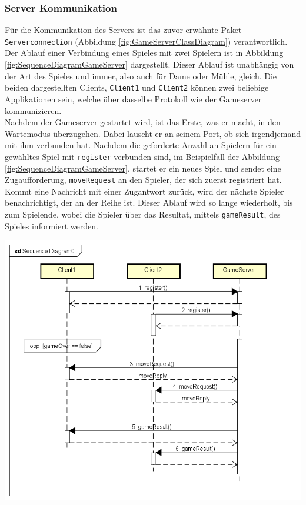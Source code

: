 \documentclass[12pt,a4paper,bibliography=totocnumbered,listof=totocnumbered]{article}
\begin{document}
\subsubsection{ Server Kommunikation }
Für die Kommunikation des Servers ist das zuvor erwähnte Paket \texttt{Serverconnection} (Abbildung \ref{fig:GameServerClassDiagram}) verantwortlich.
Der Ablauf einer Verbindung eines Spieles mit zwei Spielern ist in Abbildung \ref{fig:SequenceDiagramGameServer} dargestellt. 
Dieser Ablauf ist unabhängig von der Art des Spieles und immer, also auch für Dame oder Mühle, gleich.
Die beiden dargestellten Clients, \texttt{Client1} und \texttt{Client2} können zwei beliebige Applikationen sein, welche über dasselbe Protokoll
wie der Gameserver kommunizieren.
\\
Nachdem der Gameserver gestartet wird, ist das Erste, was er macht, in den Wartemodus überzugehen. Dabei lauscht er an seinem Port, ob sich irgendjemand
mit ihm verbunden hat. Nachdem die geforderte Anzahl an Spielern für ein gewähltes Spiel mit \texttt{register} verbunden sind, im Beispielfall der Abbildung \ref{fig:SequenceDiagramGameServer}, 
startet er ein neues Spiel und sendet eine Zugaufforderung, \texttt{moveRequest} 
an den Spieler, der sich zuerst registriert hat. Kommt eine Nachricht mit einer Zugantwort zurück,
wird der nächste Spieler benachrichtigt, der an der Reihe ist. Dieser Ablauf wird so lange wiederholt, bis zum Spielende, wobei die Spieler 
über das Resultat, mittels \texttt{gameResult}, des Spieles informiert werden.
\\


\vspace{1em}
\begin{minipage}{\linewidth}
	\centering
	\includegraphics[width=0.7\linewidth]{pics/SequenceDiagramGameServer.png}
	\label{fig:SequenceDiagramGameServer}
\end{minipage}
\end{document}
